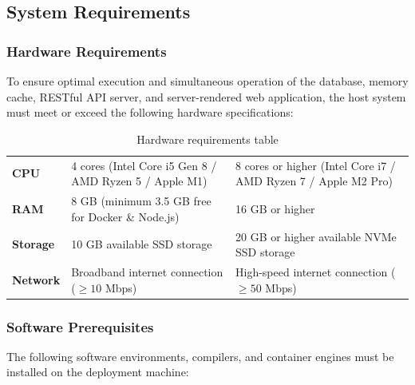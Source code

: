 \subsection{System Requirements}

\subsubsection{Hardware Requirements}

To ensure optimal execution and simultaneous operation of the database, memory cache, RESTful API server, and server-rendered web application, the host system must meet or exceed the following hardware specifications:

\begin{table}[H]
\centering
\caption{Hardware requirements table}\label{tab:hardware_req}
\renewcommand{\arraystretch}{1.4}
\setlength{\tabcolsep}{5pt}
\begin{tabular}{|L{2.8cm}|L{6.0cm}|L{6.0cm}|}
\hline
{} &  &  \\ \hline
\textbf{CPU} & 4 cores (Intel Core i5 Gen 8 / AMD Ryzen 5 / Apple M1) & 8 cores or higher (Intel Core i7 / AMD Ryzen 7 / Apple M2 Pro) \\ \hline
\textbf{RAM} & 8 GB (minimum 3.5 GB free for Docker \& Node.js) & 16 GB or higher \\ \hline
\textbf{Storage} & 10 GB available SSD storage & 20 GB or higher available NVMe SSD storage \\ \hline
\textbf{Network} & Broadband internet connection ($\ge 10$ Mbps) & High-speed internet connection ($\ge 50$ Mbps) \\ \hline
\end{tabular}
\end{table}

\subsubsection{Software Prerequisites}

The following software environments, compilers, and container engines must be installed on the deployment machine:

